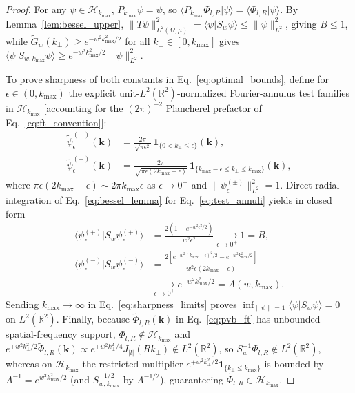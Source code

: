 \documentclass[aps,pra,onecolumn,notitlepage,11pt,tightenlines,amsmath,amssymb,floatfix,longbibliography]{revtex4-2}
\providecommand{\braket}[2]{\langle#1\vert#2\rangle}
\providecommand{\abs}[1]{\lvert#1\rvert}
\providecommand{\norm}[1]{\lVert#1\rVert}
\begin{document}
\begin{proof}
For any $\psi \in \mathcal{H}_{k_{\max}}$, $P_{k_{\max}}\psi = \psi$, so $\braket{P_{k_{\max}}\Phi_{l,R}}{\psi} = \braket{\Phi_{l,R}}{\psi}$. By Lemma~\ref{lem:bessel_upper}, $\norm{T\psi}_{L^2(\Omega,\mu)}^2 = \braket{\psi}{S_w\psi} \le \norm{\psi}_{L^2}^2$, giving $B \le 1$, while $\widetilde{G}_w(k_\perp) \ge e^{-w^2 k_{\max}^2/2}$ for all $k_\perp \in [0, k_{\max}]$ gives $\braket{\psi}{S_{w,k_{\max}}\psi} \ge e^{-w^2 k_{\max}^2/2}\norm{\psi}_{L^2}^2$.

To prove sharpness of both constants in Eq.~\eqref{eq:optimal_bounds}, define for $\epsilon \in (0, k_{\max})$ the explicit unit-$L^2(\mathbb{R}^2)$-normalized Fourier-annulus test families in $\mathcal{H}_{k_{\max}}$ [accounting for the $(2\pi)^{-2}$ Plancherel prefactor of Eq.~\eqref{eq:ft_convention}]:
\begin{align}
\widetilde{\psi}_\epsilon^{(+)}(\mathbf{k}) &= \frac{2\pi}{\sqrt{\pi\epsilon^2}}\,\mathbf{1}_{\{0 < k_\perp \le \epsilon\}}(\mathbf{k}), \nonumber \\
\widetilde{\psi}_\epsilon^{(-)}(\mathbf{k}) &= \frac{2\pi}{\sqrt{\pi\epsilon(2k_{\max}-\epsilon)}}\,\mathbf{1}_{\{k_{\max}-\epsilon \le k_\perp \le k_{\max}\}}(\mathbf{k}),
\label{eq:test_annuli}
\end{align}
where $\pi\epsilon(2k_{\max}-\epsilon) \sim 2\pi k_{\max}\epsilon$ as $\epsilon \to 0^+$ and $\norm{\psi_\epsilon^{(\pm)}}_{L^2}^2 = 1$. Direct radial integration of Eq.~\eqref{eq:bessel_lemma} for Eq.~\eqref{eq:test_annuli} yields in closed form
\begin{align}
\braket{\psi_\epsilon^{(+)}}{S_w\psi_\epsilon^{(+)}} &= \frac{2\left(1 - e^{-w^2\epsilon^2/2}\right)}{w^2\epsilon^2} \xrightarrow[\epsilon \to 0^+]{} 1 = B, \nonumber \\
\braket{\psi_\epsilon^{(-)}}{S_w\psi_\epsilon^{(-)}} &= \frac{2\left[e^{-w^2(k_{\max}-\epsilon)^2/2} - e^{-w^2 k_{\max}^2/2}\right]}{w^2\epsilon(2k_{\max}-\epsilon)} \nonumber \\
&\xrightarrow[\epsilon \to 0^+]{} e^{-w^2 k_{\max}^2/2} = A(w, k_{\max}).
\label{eq:sharpness_limits}
\end{align}
Sending $k_{\max} \to \infty$ in Eq.~\eqref{eq:sharpness_limits} proves $\inf_{\norm{\psi}=1}\braket{\psi}{S_w\psi} = 0$ on $L^2(\mathbb{R}^2)$. Finally, because $\widetilde{\Phi}_{l,R}(\mathbf{k})$ in Eq.~\eqref{eq:pvb_ft} has unbounded spatial-frequency support, $\Phi_{l,R} \notin \mathcal{H}_{k_{\max}}$ and $e^{+w^2 k_\perp^2/2}\widetilde{\Phi}_{l,R}(\mathbf{k}) \propto e^{+w^2 k_\perp^2/4} J_{\abs{l}}(Rk_\perp) \notin L^2(\mathbb{R}^2)$, so $S_w^{-1}\Phi_{l,R} \notin L^2(\mathbb{R}^2)$, whereas on $\mathcal{H}_{k_{\max}}$ the restricted multiplier $e^{+w^2 k_\perp^2/2}\mathbf{1}_{\{k_\perp \le k_{\max}\}}$ is bounded by $A^{-1} = e^{w^2 k_{\max}^2/2}$ (and $S_{w,k_{\max}}^{-1/2}$ by $A^{-1/2}$), guaranteeing $\widetilde{\Phi}_{l,R} \in \mathcal{H}_{k_{\max}}$.
\end{proof}
\end{document}

